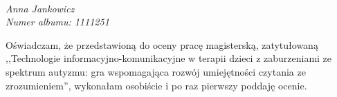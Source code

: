 \documentclass[a4paper,12pt]{report}
\newcommand{\authorname}{Anna Jankowicz}
\begin{document}
\newpage
\setcounter{page}{1}
\thispagestyle{firststyle}
\vspace*{10cm}
\emph{\\\authorname\\ Numer albumu: 1111251\\}

Oświadczam, że przedstawioną do oceny pracę magisterską, zatytułowaną
,,Technologie informacyjno-komunikacyjne w terapii dzieci z zaburzeniami ze spektrum autyzmu: gra wspomagająca rozwój umiejętności czytania ze zrozumieniem'', wykonałam osobiście i po raz pierwszy poddaję ocenie.




\tableofcontents
\thispagestyle{firststyle}







\renewcommand{\bibsetup}{\thispagestyle{firststyle}}
{\linespread{1.25}\printbibliography[heading=bibintoc]}
\end{document}
